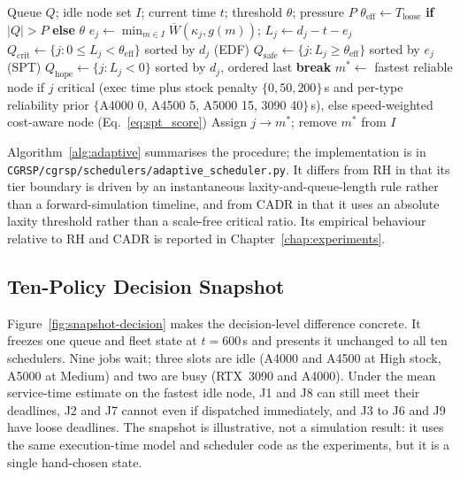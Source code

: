 \begin{algorithm}[H]
\caption{Adaptive EDF-SPT Hybrid Scheduler}
\label{alg:adaptive}
\begin{algorithmic}[1]
\REQUIRE Queue $Q$; idle node set $I$; current time $t$; threshold $\theta$; pressure $P$
\STATE $\theta_{\text{eff}} \leftarrow T_{\text{loose}}$ \textbf{if} $|Q| > P$ \textbf{else} $\theta$ 
  \STATE $e_j \leftarrow \min_{m \in I} \overline{W}(\kappa_j, g(m))$; \quad $L_j \leftarrow d_j - t - e_j$
\ENDFOR
\STATE $Q_{\text{crit}} \leftarrow \{j : 0 \leq L_j < \theta_{\text{eff}}\}$ sorted by $d_j$ (EDF)
\STATE $Q_{\text{safe}} \leftarrow \{j : L_j \geq \theta_{\text{eff}}\}$ sorted by $e_j$ (SPT)
\STATE $Q_{\text{hope}} \leftarrow \{j : L_j < 0\}$ sorted by $d_j$, ordered last
   \STATE \textbf{break} \ENDIF
  \STATE $m^* \leftarrow$ fastest reliable node if $j$ critical (exec time plus stock penalty $\{0, 50, 200\}$\,s and per-type reliability prior $\{$A4000 0, A4500 5, A5000 15, 3090 40$\}$\,s), else speed-weighted cost-aware node (Eq.~\ref{eq:spt_score})
  \STATE Assign $j \to m^*$; remove $m^*$ from $I$
\ENDFOR
\end{algorithmic}
\end{algorithm}

Algorithm~\ref{alg:adaptive} summarises the procedure; the implementation is in \texttt{CGRSP/\allowbreak cgrsp/\allowbreak schedulers/\allowbreak adaptive\allowbreak\_scheduler.py}. It differs from RH in that its tier boundary is driven by an instantaneous laxity-and-queue-length rule rather than a forward-simulation timeline, and from CADR in that it uses an absolute laxity threshold rather than a scale-free critical ratio. Its empirical behaviour relative to RH and CADR is reported in Chapter~\ref{chap:experiments}.

\subsection{Ten-Policy Decision Snapshot}
\label{ssec:ten-policy-decision-snapshot}

Figure~\ref{fig:snapshot-decision} makes the decision-level difference concrete. It freezes one queue and fleet state at $t=600$\,s and presents it unchanged to all ten schedulers. Nine jobs wait; three slots are idle (A4000 and A4500 at High stock, A5000 at Medium) and two are busy (RTX~3090 and A4000). Under the mean service-time estimate on the fastest idle node, J1 and J8 can still meet their deadlines, J2 and J7 cannot even if dispatched immediately, and J3 to J6 and J9 have loose deadlines. The snapshot is illustrative, not a simulation result: it uses the same execution-time model and scheduler code as the experiments, but it is a single hand-chosen state.

